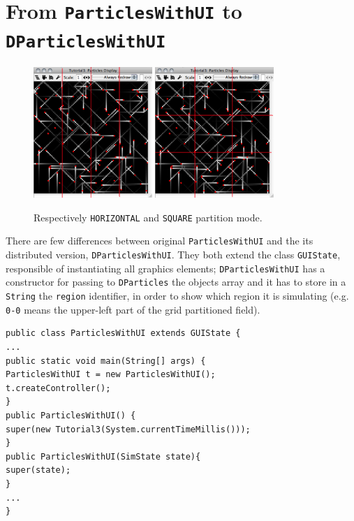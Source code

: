 \documentclass{article}
\begin{document}
\section{From \texttt{ParticlesWithUI} to \texttt{DParticlesWithUI}}
\begin{figure}
\centering
\includegraphics[width=0.4\textwidth,bb=0 0 470 520]{particles-h.png} 
\includegraphics[width=0.4\textwidth,bb=0 0 470 520]{particles-m.png}
\caption{Respectively \texttt{HORIZONTAL} and \texttt{SQUARE} partition mode.}
\label{fig:dp01}
\end{figure}
There are few differences between original \texttt{ParticlesWithUI} and the its distributed version, \texttt{DParticlesWithUI}. They both extend the class \texttt{GUIState}, responsible of instantiating all graphics elements; \texttt{DParticlesWithUI} has a constructor for passing to \texttt{DParticles} the objects array and it has to store in a \texttt{String} the \texttt{region} identifier, in order to show which region it is simulating (e.g. \texttt{0-0} means the upper-left part of the grid partitioned field).
\begin{lstlisting}
public class ParticlesWithUI extends GUIState {
...
public static void main(String[] args) {
ParticlesWithUI t = new ParticlesWithUI();
t.createController();
}
public ParticlesWithUI() { 
super(new Tutorial3(System.currentTimeMillis()));
}
public ParticlesWithUI(SimState state){
super(state);
}
...
}
\end{lstlisting}
\end{document}
